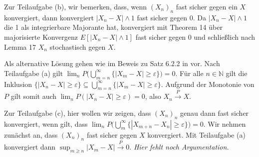 \documentclass{article}
\begin{document}
Zur Teilaufgabe (b), wir bemerken, dass, wenn $(X_n)_n$ fast sicher gegen ein $X$ konvergiert, dann konvergiert $|X_n-X|\wedge1$ fast sicher gegen 0.
Da $|X_n-X|\wedge1$ die 1 als integrierbare Majorante hat,  konvergiert mit Theorem 14 über majorisierte Konvergenz $E[|X_n-X|\wedge 1]$ fast sicher gegen 0 und schließlich nach Lemma 17 $X_n$ stochastisch gegen $X$.

Als alternative Lösung gehen wie im Beweis zu Satz 6.2.2 in \cite{hesse} vor.
Nach Teilaufgabe (a) gilt $\lim_nP\bigl(\bigcup\nolimits_{m=n}^\infty\{|X_m-X|\geq\varepsilon\}\bigr)=0$.
Für alle $n\in\mathbb{N}$ gilt die Inklusion $\{|X_n-X|\geq\varepsilon\}\subseteq\bigcup\nolimits_{m=n}^\infty\{|X_m-X|\geq\varepsilon\}$.
Aufgrund der Monotonie von $P$ gilt somit auch $\lim_{n}P(|X_n-X|\geq\varepsilon)=0$, also  $X_n\xrightarrow{P}X$.

Zur Teilaufgabe (c), hier wollen wir zeigen, dass $(X_n)_n$ genau dann fast sicher konvergiert, wenn gilt, dass $\lim_n P\bigl(\bigcup_m^\infty\{|X_{m+n}-X_n|\geq\varepsilon\}\bigr)=0$.
Wir nehmen zunächst an, dass $(X_n)_n$ fast sicher gegen $X$ konvergiert.
Mit Teilaufgabe (a) konvergiert dann $\sup_{m\geq n}|X_m-X|\xrightarrow{P}0$.
\emph{Hier fehlt noch Argumentation.}
\newpage
\end{document}
